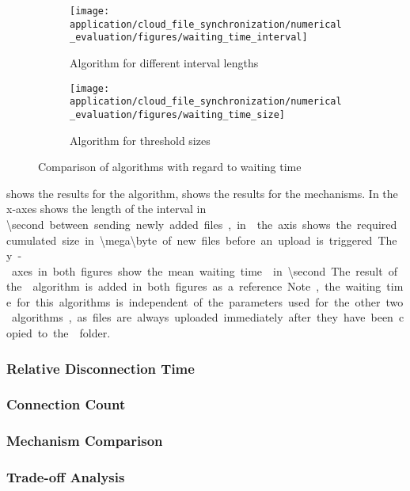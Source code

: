 \begin{figure}
	\begin{subfigure}[b]{\textwidth}
	\centering
	\texttt{[image: application/cloud\_file\_synchronization/numerical\_evaluation/figures/waiting\_time\_interval]}
	\caption{Algorithm \algointerval for different interval lengths}\label{fig:application:cloud_file_synchronisation:numerical_evaluation:waiting_time:waiting_time:interval}
	\end{subfigure} 
	\begin{subfigure}[b]{\textwidth}
	\centering
	\texttt{[image: application/cloud\_file\_synchronization/numerical\_evaluation/figures/waiting\_time\_size]}
	\caption{Algorithm \algosize for threshold sizes}\label{fig:application:cloud_file_synchronisation:numerical_evaluation:waiting_time:waiting_time:size}
	\end{subfigure}

	\caption{Comparison of algorithms with regard to waiting time}\label{fig:application:cloud_file_synchronisation:numerical_evaluation:waiting_time:waiting_time}
\end{figure}

 shows the results for the \algointerval algorithm,  shows the results for the \algosize mechanisms. 
In  the x-axes shows the length of the interval in \SI{\second} between sending newly added files, in  the axis shows the required cumulated size in \SI{\mega\byte} of new files before an upload is triggered.
The y-axes in both figures show the mean waiting time \sojournTime in \SI{\second}.
The result of the \algoimmediate algorithm is added in both figures as a reference.
Note, the waiting time for this algorithms is independent of the parameters used for the other two algorithms, as files are always uploaded immediately after they have been copied to the \dropbox folder.

\subsubsection*{Relative Disconnection Time}\label{sec:application:cloud_file_synchronisation:numerical_evaluation:relative_disconnection_time}
\subsubsection*{Connection Count}\label{sec:application:cloud_file_synchronisation:numerical_evaluation:connection_count}
\subsubsection*{Mechanism Comparison}\label{sec:application:cloud_file_synchronisation:numerical_evaluation:mechanism_comparison}
\subsubsection*{Trade-off Analysis}\label{sec:application:cloud_file_synchronisation:numerical_evaluation:trade_off_analysis}